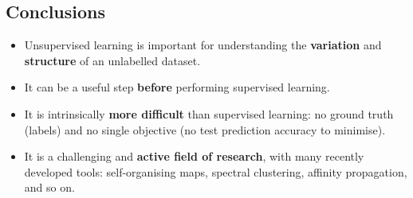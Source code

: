 \documentclass[11pt,a4paper]{article}
\theoremstyle{definition}
\theoremstyle{plain}
\theoremstyle{remark}
\begin{document}
\subsection{Conclusions}

\begin{tcolorbox}[colback=green!5!white,colframe=green!75!black,title=\textbf{Unsupervised Learning: Key Takeaways}]
\begin{itemize}
    \item Unsupervised learning is important for understanding the \textbf{variation} and \textbf{structure} of an unlabelled dataset.
    \item It can be a useful step \textbf{before} performing supervised learning.
    \item It is intrinsically \textbf{more difficult} than supervised learning: no ground truth (labels) and no single objective (no test prediction accuracy to minimise).
    \item It is a challenging and \textbf{active field of research}, with many recently developed tools: self-organising maps, spectral clustering, affinity propagation, and so on.
\end{itemize}
\end{tcolorbox}
\end{document}

